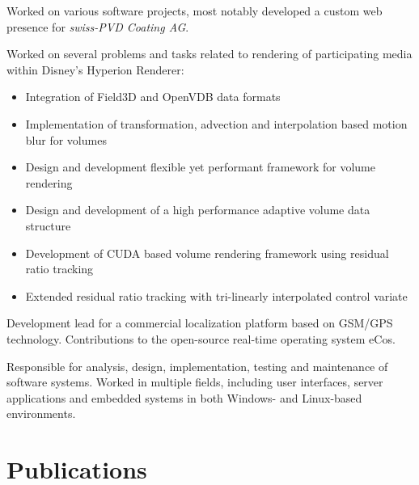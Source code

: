 \documentclass[10pt,a4paper,sans]{moderncv}
\begin{document}
{
Worked on various software projects, most notably developed a custom web presence for \textit{swiss-PVD Coating AG}.
}

{
Worked on several problems and tasks related to rendering of participating media within Disney's Hyperion Renderer:
\begin{itemize}
\item Integration of Field3D and OpenVDB data formats
\item Implementation of transformation, advection and interpolation based motion blur for volumes
\item Design and development flexible yet performant framework for volume rendering
\item Design and development of a high performance adaptive volume data structure
\end{itemize}
}

{
\begin{itemize}
\item Development of CUDA based volume rendering framework using residual ratio tracking
\item Extended residual ratio tracking with tri-linearly interpolated control variate
\end{itemize}
}

{
Development lead for a commercial localization platform based on GSM/GPS technology. Contributions to the open-source real-time operating system eCos.
}

{
Responsible for analysis, design, implementation, testing and maintenance of software systems. Worked in multiple fields, including user interfaces, server applications and embedded systems in both Windows- and Linux-based environments.
}


\section{Publications}

\end{document}
